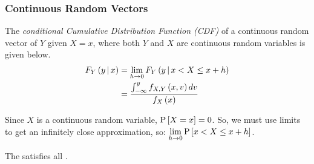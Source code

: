 \subsubsection{Continuous Random Vectors}\label{subsubsec:Conditional Probability Continuous Random Vectors}
\begin{definition}\label{def:Continuous Random Vector-Conditional CDF}
  The \emph{conditional Cumulative Distribution Function (CDF)} of a continuous random vector of $Y$ given $X=x$, where both $Y$ and $X$ are continuous random variables is given below.
  \begin{equation}
    \begin{aligned}
      F_{Y} \left( y \operatorname{\vert} x \right) &= \lim\limits_{h \rightarrow 0} F_{Y} \left( y \operatorname{\vert} x < X \leq x+h \right) \\
      &= \frac{\int_{-\infty}^{y} f_{X,Y} \left( x,v \right) dv}{f_{X} \left( x \right)} \\
    \end{aligned}
  \end{equation}
  \begin{remark}
    Since $X$ is a continuous random variable, $\operatorname{\operatorname{P}} \left[ X=x \right] =0$.
    So, we must use limits to get an infinitely close approximation, so: $\lim \limits_{h \rightarrow 0} \operatorname{\operatorname{P}} \left[ x < X \leq x+h \right]$.
  \end{remark}
  \begin{remark}
    The  satisfies all .
  \end{remark}
\end{definition}
